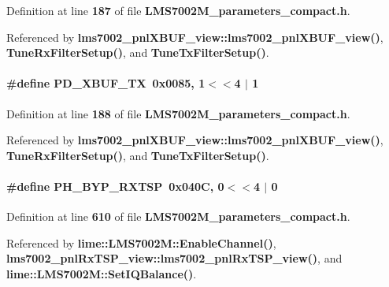 Definition at line {\bf 187} of file {\bf L\+M\+S7002\+M\+\_\+parameters\+\_\+compact.\+h}.



Referenced by {\bf lms7002\+\_\+pnl\+X\+B\+U\+F\+\_\+view\+::lms7002\+\_\+pnl\+X\+B\+U\+F\+\_\+view()}, {\bf Tune\+Rx\+Filter\+Setup()}, and {\bf Tune\+Tx\+Filter\+Setup()}.

\paragraph[{P\+D\+\_\+\+X\+B\+U\+F\+\_\+\+TX}]{\setlength{\rightskip}{0pt plus 5cm}\#define P\+D\+\_\+\+X\+B\+U\+F\+\_\+\+TX~0x0085, 1$<$$<$4 $\vert$  1}\label{LMS7002M__parameters__compact_8h_a9c79b874a46b4079a3578b37f320e8a4}


Definition at line {\bf 188} of file {\bf L\+M\+S7002\+M\+\_\+parameters\+\_\+compact.\+h}.



Referenced by {\bf lms7002\+\_\+pnl\+X\+B\+U\+F\+\_\+view\+::lms7002\+\_\+pnl\+X\+B\+U\+F\+\_\+view()}, {\bf Tune\+Rx\+Filter\+Setup()}, and {\bf Tune\+Tx\+Filter\+Setup()}.

\paragraph[{P\+H\+\_\+\+B\+Y\+P\+\_\+\+R\+X\+T\+SP}]{\setlength{\rightskip}{0pt plus 5cm}\#define P\+H\+\_\+\+B\+Y\+P\+\_\+\+R\+X\+T\+SP~0x040\+C, 0$<$$<$4 $\vert$  0}\label{LMS7002M__parameters__compact_8h_ac8f443675c26a4b47896a59402e5368a}


Definition at line {\bf 610} of file {\bf L\+M\+S7002\+M\+\_\+parameters\+\_\+compact.\+h}.



Referenced by {\bf lime\+::\+L\+M\+S7002\+M\+::\+Enable\+Channel()}, {\bf lms7002\+\_\+pnl\+Rx\+T\+S\+P\+\_\+view\+::lms7002\+\_\+pnl\+Rx\+T\+S\+P\+\_\+view()}, and {\bf lime\+::\+L\+M\+S7002\+M\+::\+Set\+I\+Q\+Balance()}.

